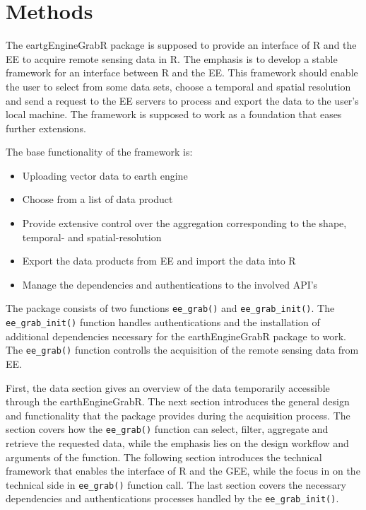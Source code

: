 \chapter{Methods}

The eartgEngineGrabR package is supposed to provide an interface of R and the EE to acquire remote sensing data in R. The emphasis is to develop a stable framework for an interface between R and the EE. This framework should enable the user to select from some data sets, choose a temporal and spatial resolution and send a request to the EE servers to process and export the data to the user's local machine. The framework is supposed to work as a foundation that eases further extensions.

The base functionality of the framework is: 
\begin{itemize}
	\item Uploading vector data to earth engine
	\item Choose from a list of data product
	\item Provide extensive control over the aggregation corresponding to the shape, temporal- and spatial-resolution
	\item Export the data products from EE and import the data into R
	\item Manage the dependencies and authentications to the involved API's
\end{itemize}

The package consists of two functions \mbox{\texttt{ee\_grab()}} and \mbox{\texttt{ee\_grab\_init()}}. The \texttt{ee\_grab\_init()} function handles authentications and the installation of additional dependencies necessary for the earthEngineGrabR package to work. The \texttt{ee\_grab()} function controlls the acquisition of the remote sensing data from EE.

First, the data section gives an overview of the data temporarily accessible through the earthEngineGrabR. 
The next section introduces the general design and functionality that the package provides during the acquisition process. The section covers how the \texttt{ee\_grab()} function can select, filter, aggregate and retrieve the requested data, while the emphasis lies on the design workflow and arguments of the function.
The following section introduces the technical framework that enables the interface of R and the GEE, while the focus in on the technical side in \texttt{ee\_grab()} function call.
The last section covers the necessary dependencies and authentications processes handled by the \texttt{ee\_grab\_init()}.

